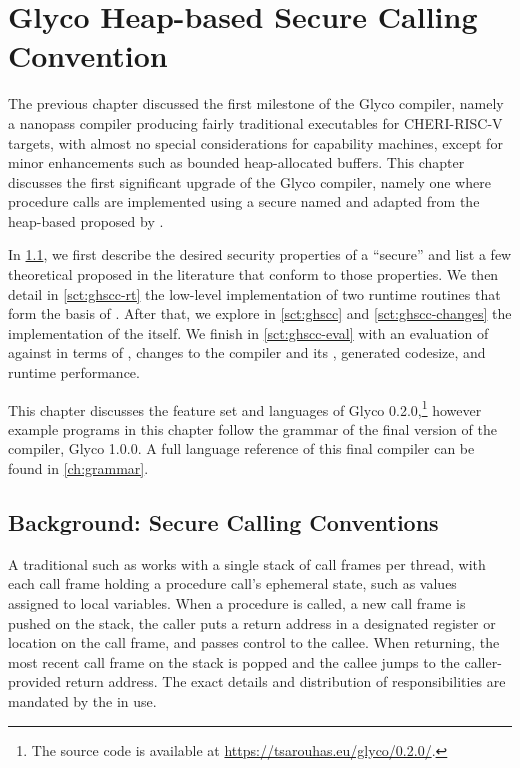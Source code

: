 \documentclass[main.tex]{subfiles}
\begin{document}
\onlyinsubfile{\mainmatter{}}

\chapter{Glyco Heap-based Secure Calling Convention}
The previous chapter discussed the first milestone of the Glyco compiler, namely a nanopass compiler producing fairly traditional executables for CHERI-RISC-V targets, with almost no special considerations for capability machines, except for minor enhancements such as bounded heap-allocated buffers. This chapter discusses the first significant upgrade of the Glyco compiler, namely one where procedure calls are implemented using a secure  named \textbf{} and adapted from the heap-based  proposed by \cite{cerise}.

In \cref{sct:scc}, we first describe the desired security properties of a \enquote{secure}  and list a few theoretical  proposed in the literature that conform to those properties. We then detail in \cref{sct:ghscc-rt} the low-level implementation of two runtime routines that form the basis of . After that, we explore in \cref{sct:ghscc} and \cref{sct:ghscc-changes} the implementation of the  itself. We finish in \cref{sct:ghscc-eval} with an evaluation of  against  in terms of , changes to the compiler and its , generated codesize, and runtime performance.

This chapter discusses the feature set and languages of Glyco 0.2.0,\footnote{The source code is available at \url{https://tsarouhas.eu/glyco/0.2.0/}.} however example programs in this chapter follow the grammar of the final version of the compiler, Glyco 1.0.0. A full language reference of this final compiler can be found in \cref{ch:grammar}.

\section{Background: Secure Calling Conventions} \label{sct:scc}
A traditional  such as  works with a single stack of call frames per thread, with each call frame holding a procedure call's ephemeral state, such as values assigned to local variables. When a procedure is called, a new call frame is pushed on the stack, the caller puts a return address in a designated register or location on the call frame, and passes control to the callee. When returning, the most recent call frame on the stack is popped and the callee jumps to the caller-provided return address. The exact details and distribution of responsibilities are mandated by the  in use.
\end{document}
